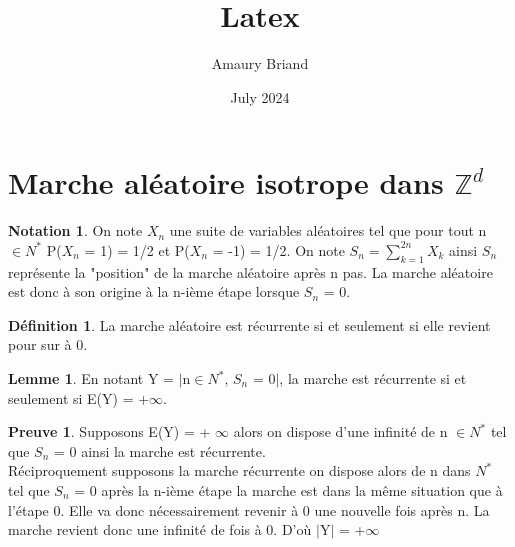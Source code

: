 \documentclass{article}
\title{Latex}
\author{Amaury Briand}
\date{July 2024}
\theoremstyle{definition}
\newtheorem{lemme}{Lemme}
\newtheorem{definition}{Définition}
\newtheorem{preuve}{Preuve}
\newtheorem{notation}{Notation}
\begin{document}
\maketitle


\section{Marche aléatoire isotrope dans $\mathbb{Z}^d$}

\begin{notation}
On note $X_{n}$ une suite de variables aléatoires tel que pour tout n$\in {N}^{*}$ P($X_{n}$ = 1) = 1/2 et P($X_{n}$ = -1) = 1/2. On note $S_{n} = \sum_{k=1}^{2n} X_{k}$ ainsi $S_{n}$ représente la "position" de la marche aléatoire après n pas. La marche aléatoire est donc à son origine à la n-ième étape lorsque $S_{n}$ = 0.
\end{notation}

\begin{definition}
    La marche aléatoire est récurrente si et seulement si elle revient pour sur à 0.
\end{definition}

\begin{lemme}
    En notant Y = $|$n$\in {N}^{*}$, $S_{n}$ = 0$|$, la marche est récurrente si et seulement si E(Y) = +$\infty$.
\end{lemme}

\begin{preuve}
    Supposons E(Y) = + $\infty$ alors on dispose d'une infinité de n $\in {N}^{*}$ tel que $S_{n}$ = 0 ainsi la marche est récurrente.\\
    Réciproquement supposons la marche récurrente on dispose alors de n dans $N^{*}$ tel que  $S_{n}$ = 0 après la n-ième étape la marche est dans la même situation que à l'étape 0. Elle va donc nécessairement revenir à 0 une nouvelle fois après n. La marche revient donc une infinité de fois à 0. D'où $|$Y$|$ = +$\infty$
\end{preuve}
\end{document}
